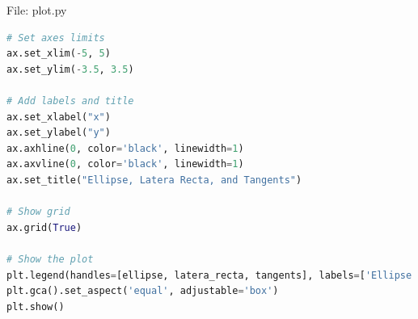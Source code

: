 \documentclass{beamer}
\numberwithin{equation}{section}
\theoremstyle{remark}
\begin{document}
\begin{frame}[fragile]{File: plot.py}
\begin{lstlisting}[language=Python]
# Set axes limits
ax.set_xlim(-5, 5)
ax.set_ylim(-3.5, 3.5)

# Add labels and title
ax.set_xlabel("x")
ax.set_ylabel("y")
ax.axhline(0, color='black', linewidth=1)
ax.axvline(0, color='black', linewidth=1)
ax.set_title("Ellipse, Latera Recta, and Tangents")

# Show grid
ax.grid(True)

# Show the plot
plt.legend(handles=[ellipse, latera_recta, tangents], labels=['Ellipse: $\\frac{x^2}{9} + \\frac{y^2}{5} = 1$', 'Latera Recta', 'Tangents'])
plt.gca().set_aspect('equal', adjustable='box')
plt.show()
\end{lstlisting}
\end{frame}
\end{document}
